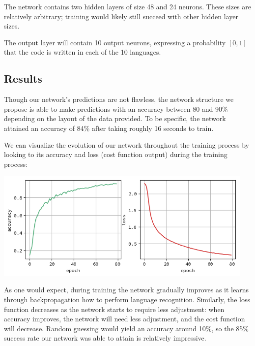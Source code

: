 \documentclass{article}
\begin{document}
The network contains two hidden layers of size 48 and 24 neurons. These sizes are relatively arbitrary; training would likely still succeed with other hidden layer sizes.

The output layer will contain 10 output neurons, expressing a probability $[0,1]$ that the code is written in each of the 10 languages.

\subsection{Results}
Though our network's predictions are not flawless, the network structure we propose is able to make predictions with an accuracy between 80 and 90\% depending on the layout of the data provided. To be specific, the network attained an accuracy of 84\% after taking roughly 16 seconds to train.

We can visualize the evolution of our network throughout the training process by looking to its accuracy and loss (cost function output) during the training process:

\begin{center}
    \includegraphics[width=5in]{history}
\end{center}

As one would expect, during training the network gradually improves as it learns through backpropagation how to perform language recognition. Similarly, the loss function decreases as the network starts to require less adjustment: when accuracy improves, the network will need less adjustment, and the cost function will decrease. Random guessing would yield an accuracy around 10\%, so the 85\% success rate our network was able to attain is relatively impressive.
\end{document}
